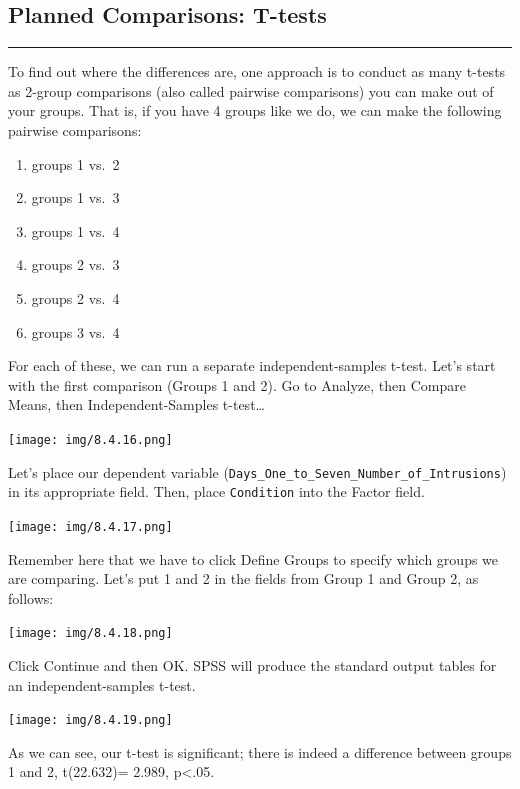 \documentclass[]{book}
\providecommand{\tightlist}{%
  \setlength{\itemsep}{0pt}\setlength{\parskip}{0pt}}
\begin{document}
\subsection{Planned Comparisons:
T-tests}\label{planned-comparisons-t-tests}

\begin{center}\rule{0.5\linewidth}{0.5pt}\end{center}

To find out where the differences are, one approach is to conduct as
many t-tests as 2-group comparisons (also called pairwise comparisons)
you can make out of your groups. That is, if you have 4 groups like we
do, we can make the following pairwise comparisons:

\begin{enumerate}
\def\labelenumi{\arabic{enumi}.}
\tightlist
\item
  groups 1 vs.~2
\item
  groups 1 vs.~3
\item
  groups 1 vs.~4
\item
  groups 2 vs.~3
\item
  groups 2 vs.~4
\item
  groups 3 vs.~4
\end{enumerate}

For each of these, we can run a separate independent-samples t-test.
Let's start with the first comparison (Groups 1 and 2). Go to {Analyze},
then {Compare Means}, then {Independent-Samples t-test\ldots{}}

\texttt{[image: img/8.4.16.png]}

Let's place our dependent variable
(\texttt{Days\_One\_to\_Seven\_Number\_of\_Intrusions}) in its
appropriate field. Then, place \texttt{Condition} into the Factor field.

\texttt{[image: img/8.4.17.png]}

Remember here that we have to click {Define Groups} to specify which
groups we are comparing. Let's put 1 and 2 in the fields from Group 1
and Group 2, as follows:

\texttt{[image: img/8.4.18.png]}

Click {Continue} and then {OK}. SPSS will produce the standard output
tables for an independent-samples t-test.

\texttt{[image: img/8.4.19.png]}

As we can see, our t-test is significant; there is indeed a difference
between groups 1 and 2, t(22.632)= 2.989, p\textless{}.05.
\end{document}
